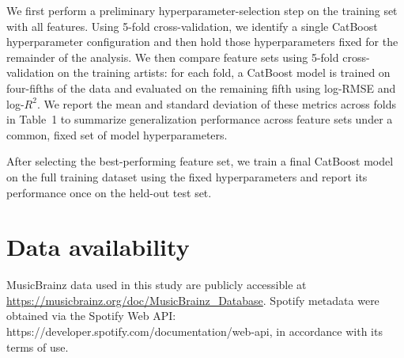 \documentclass[fleqn,10pt]{wlscirep}
\begin{document}
We first perform a preliminary hyperparameter-selection step on the training set with all features. Using 5-fold cross-validation, we identify a single CatBoost hyperparameter configuration and then hold those hyperparameters fixed for the remainder of the analysis. We then compare feature sets using 5-fold cross-validation on the training artists: for each fold, a CatBoost model is trained on four-fifths of the data and evaluated on the remaining fifth using log-RMSE and log-\(R^2\). We report the mean and standard deviation of these metrics across folds in Table~1 to summarize generalization performance across feature sets under a common, fixed set of model hyperparameters.

After selecting the best-performing feature set, we train a final CatBoost model on the full training dataset using the fixed hyperparameters and report its performance once on the held-out test set.


\section*{Data availability}
MusicBrainz data used in this study are publicly accessible at \url{https://musicbrainz.org/doc/MusicBrainz_Database}. Spotify metadata were obtained via the Spotify Web API: https://developer.spotify.com/documentation/web-api, in accordance with its terms of use.


\end{document}
